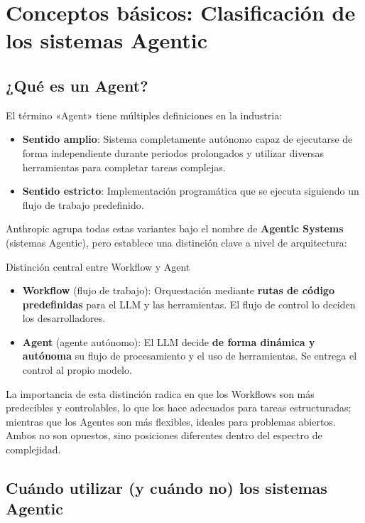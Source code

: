 \section{Conceptos básicos: Clasificación de los sistemas Agentic}

\subsection{¿Qué es un Agent?}

El término «Agent» tiene múltiples definiciones en la industria:
\begin{itemize}
    \item \textbf{Sentido amplio}: Sistema completamente autónomo capaz de ejecutarse de forma independiente durante periodos prolongados y utilizar diversas herramientas para completar tareas complejas.
    \item \textbf{Sentido estricto}: Implementación programática que se ejecuta siguiendo un flujo de trabajo predefinido.
\end{itemize}

Anthropic agrupa todas estas variantes bajo el nombre de \textbf{Agentic Systems} (sistemas Agentic), pero establece una distinción clave a nivel de arquitectura:

\begin{importantbox}{Distinción central entre Workflow y Agent}
\begin{itemize}
    \item \textbf{Workflow} (flujo de trabajo): Orquestación mediante \textbf{rutas de código predefinidas} para el LLM y las herramientas. El flujo de control lo deciden los desarrolladores.
    \item \textbf{Agent} (agente autónomo): El LLM decide \textbf{de forma dinámica y autónoma} su flujo de procesamiento y el uso de herramientas. Se entrega el control al propio modelo.
\end{itemize}
\end{importantbox}

La importancia de esta distinción radica en que los Workflows son más predecibles y controlables, lo que los hace adecuados para tareas estructuradas; mientras que los Agentes son más flexibles, ideales para problemas abiertos. Ambos no son opuestos, sino posiciones diferentes dentro del espectro de complejidad.

\subsection{Cuándo utilizar (y cuándo no) los sistemas Agentic}

